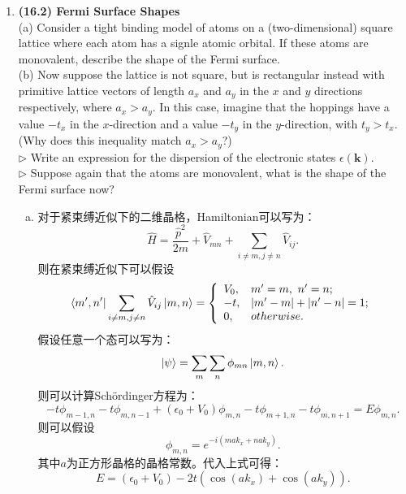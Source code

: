 \documentclass[reqno,a4paper,12pt]{amsart}
\begin{document}
\begin{enumerate}[1.]
\item \textbf{(16.2) Fermi Surface Shapes} \\
(a) Consider a tight binding model of atoms on a (two-dimensional) square lattice where each atom has a signle atomic orbital. If these atoms are monovalent, describe the shape of the Fermi surface. \\
(b) Now suppose the lattice is not square, but is rectangular instead with primitive lattice vectors of length $a_x$ and $a_y$ in the $x$ and $y$ directions respectively, where $a_x>a_y$. In this case, imagine that the hoppings have a value $-t_x$ in the $x$-direction and a value $-t_y$ in the $y$-direction, with $t_y>t_x$. (Why does this inequality match $a_x>a_y$?) \\
$\triangleright$ Write an expression for the dispersion of the electronic states $\epsilon(\mathbf{k})$. \\
$\triangleright$ Suppose again that the atoms are monovalent, what is the shape of the Fermi surface now?
\begin{tcolorbox}[breakable, colback = black!5!white, colframe = black]
\begin{enumerate}[(a)]
\item 对于紧束缚近似下的二维晶格，Hamiltonian可以写为：
\[
	\hat{H} = \frac{\hat{p}^2}{2m} + \hat{V}_{mn} + \sum_{i\neq m, j\neq n} \hat{V}_{ij}.
\]
则在紧束缚近似下可以假设
\[
	\bra{m',n'} \sum_{i\neq m, j\neq n}\hat{V}_{ij} \ket{m,n} = \left\{ \begin{array}{ll}
		V_0, & m' = m,~n'=n; \\
		-t, & \vert m'-m \vert + \vert n'-n \vert = 1; \\
		0, & otherwise.
	\end{array} \right.
\]
假设任意一个态可以写为：
\[
	\ket{\psi} = \sum_m\sum_n \phi_{mn}\ket{m,n}.
\]
则可以计算Sch{\"o}rdinger方程为：
\[
	-t\phi_{m-1,n} - t\phi_{m,n-1} + (\epsilon_0+V_0) \phi_{m,n} - t\phi_{m+1,n} - t\phi_{m,n+1} = E\phi_{m,n}.
\]
则可以假设
\[
	\phi_{m,n} = e^{-i(mak_x+nak_y)}.
\]
其中$a$为正方形晶格的晶格常数。代入上式可得：
\[
	E = (\epsilon_0+V_0) - 2t(\cos(ak_x) + \cos(ak_y)).
\]
\begin{figure}[H]
	\centering
	 \hspace{2em}

\end{figure}
\end{enumerate}
\end{tcolorbox}
\end{enumerate}
\end{document}
